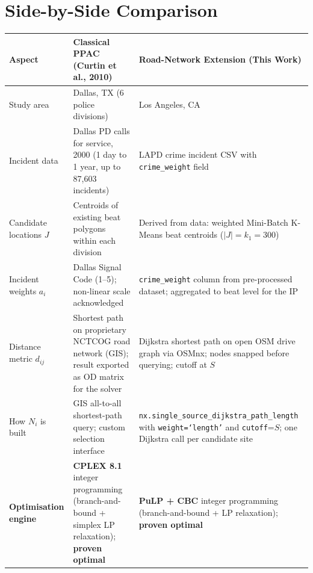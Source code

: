 \documentclass[12pt]{article}
\begin{document}
\section{Side-by-Side Comparison}

\begin{table}[h]
\centering
\renewcommand{\arraystretch}{1.4}
\begin{tabularx}{\textwidth}{@{} l X X @{}}
\toprule
\textbf{Aspect}
    & \textbf{\color{ppacblue}Classical PPAC}
      \textcolor{ppacblue}{(Curtin et al., 2010)}
    & \textbf{\color{roadgreen}Road-Network Extension}
      \textcolor{roadgreen}{(This Work)} \\
\midrule

Study area
    & Dallas, TX (6 police divisions)
    & Los Angeles, CA \\

\addlinespace
Incident data
    & Dallas PD calls for service, 2000
      (1 day to 1 year, up to 87,603 incidents)
    & LAPD crime incident CSV with \texttt{crime\_weight} field \\

\addlinespace
Candidate locations $J$
    & Centroids of existing beat polygons within each division
    & Derived from data: weighted Mini-Batch K-Means beat centroids
      ($|J| = k_1 = 300$) \\

\addlinespace
Incident weights $a_i$
    & Dallas Signal Code (1--5); non-linear scale acknowledged
    & \texttt{crime\_weight} column from pre-processed dataset;
      aggregated to beat level for the IP \\

\addlinespace
Distance metric $d_{ij}$
    & Shortest path on proprietary NCTCOG road network (GIS);
      result exported as OD matrix for the solver
    & Dijkstra shortest path on open OSM drive graph via OSMnx;
      nodes snapped before querying; cutoff at $S$ \\

\addlinespace
How $N_i$ is built
    & GIS all-to-all shortest-path query; custom selection interface
    & \texttt{nx.single\_source\_dijkstra\_path\_length} with
      \texttt{weight=`length'} and \texttt{cutoff}=$S$;
      one Dijkstra call per candidate site \\

\addlinespace
\textbf{Optimisation engine}
    & \textbf{CPLEX 8.1} integer programming
      (branch-and-bound + simplex LP relaxation);
      \textbf{proven optimal}
    & \textbf{PuLP + CBC} integer programming
      (branch-and-bound + LP relaxation);
      \textbf{proven optimal} \\


\end{tabularx}
\end{table}
\end{document}
